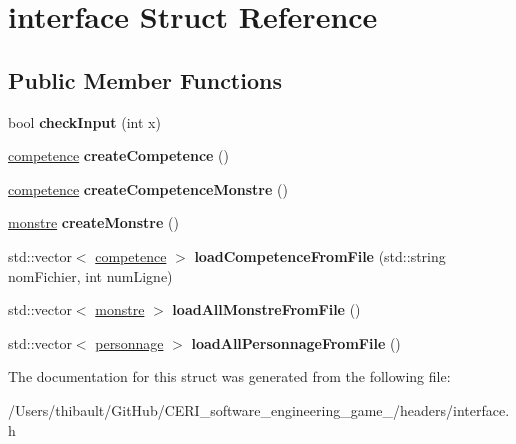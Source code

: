 \hypertarget{structinterface}{}\section{interface Struct Reference}
\label{structinterface}
\subsection*{Public Member Functions}
\begin{DoxyCompactItemize}
\item 
\mbox{\label{structinterface_ac62d78113444bf8a94024f04bf352b20}} 
bool {\bfseries check\+Input} (int x)
\item 
\mbox{\label{structinterface_a4572b6079e247818c0ed14676443d57c}} 
\hyperlink{classcompetence}{competence} {\bfseries create\+Competence} ()
\item 
\mbox{\label{structinterface_a2917ff8eb07888922d0ffb25c2900da5}} 
\hyperlink{classcompetence}{competence} {\bfseries create\+Competence\+Monstre} ()
\item 
\mbox{\label{structinterface_aa34f1425be9cb347194599eb185605f2}} 
\hyperlink{classmonstre}{monstre} {\bfseries create\+Monstre} ()
\item 
\mbox{\label{structinterface_a8a29c1768fff0595d2ec4e29ddd87a51}} 
std\+::vector$<$ \hyperlink{classcompetence}{competence} $>$ {\bfseries load\+Competence\+From\+File} (std\+::string nom\+Fichier, int num\+Ligne)
\item 
\mbox{\label{structinterface_a0a18657e75e721f7160564e556202826}} 
std\+::vector$<$ \hyperlink{classmonstre}{monstre} $>$ {\bfseries load\+All\+Monstre\+From\+File} ()
\item 
\mbox{\label{structinterface_a9c0800209c71ff3e76f2e3a6e8c54041}} 
std\+::vector$<$ \hyperlink{classpersonnage}{personnage} $>$ {\bfseries load\+All\+Personnage\+From\+File} ()
\end{DoxyCompactItemize}


The documentation for this struct was generated from the following file\+:\begin{DoxyCompactItemize}
\item 
/\+Users/thibault/\+Git\+Hub/\+C\+E\+R\+I\+\_\+software\+\_\+engineering\+\_\+game\+\_/headers/interface.\+h\end{DoxyCompactItemize}
